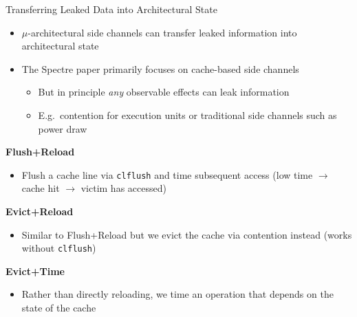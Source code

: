 \documentclass[10pt, dvipsnames, aspectratio=169]{beamer}
\begin{document}
\begin{frame}[c]{Transferring Leaked Data into Architectural State}
  \begin{itemize}
    \item $\mu$-architectural side channels can transfer leaked information into architectural state
    \item The Spectre paper primarily focuses on cache-based side channels
    \begin{itemize}
      \item But in principle \textit{any} observable effects can leak information
      \item E.g.~contention for execution units or traditional side channels such as power draw
    \end{itemize}
  \end{itemize}

  \vfill
  {\bf Flush+Reload}
  \begin{itemize}
    \item Flush a cache line via {\tt clflush} and time subsequent access (low time $\rightarrow$ cache hit $\rightarrow$ victim has accessed)
  \end{itemize}

  \vfill
  {\bf Evict+Reload}
  \begin{itemize}
    \item Similar to Flush+Reload but we evict the cache via contention instead (works without {\tt clflush})
  \end{itemize}

  \vfill
  {\bf Evict+Time}
  \begin{itemize}
    \item Rather than directly reloading, we time an operation that depends on the state of the cache
  \end{itemize}
\end{frame}
\end{document}
